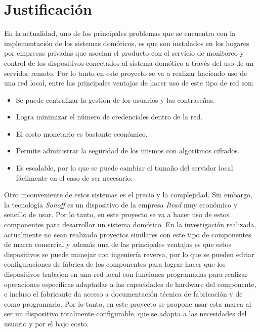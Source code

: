 \section{Justificación}

En la actualidad, uno de los principales problemas que se encuentra con la implementación de los sistemas domóticos, es que son instalados en los hogares por empresas privadas que asocian el producto con el servicio de monitoreo y control de los dispositivos conectados al sistema domótico a través del uso de un servidor remoto. Por lo tanto en este proyecto se va a realizar haciendo uso de una red local, entre las principales ventajas de hacer uso de este tipo de red son:

\begin{itemize}
\item Se puede centralizar la gestión de los usuarios y las contraseñas.
\item Logra minimizar el número de credenciales dentro de la red.
\item El costo monetario es bastante económico.
\item Permite administrar la seguridad de los mismos con algoritmos cifrados.
\item Es escalable, por lo que se puede cambiar el tamaño del servidor local fácilmente en el caso de ser necesario.
\end{itemize}

Otro inconveniente de estos sistemas es el precio y la complejidad. Sin embargo, la tecnología \textit{Sonoff} es un dispositivo de la empresa \textit{Itead} muy económico y sencillo de usar. Por lo tanto, en este proyecto se va a hacer uso de  estos componentes para desarrollar un sistema domótico. En la investigación realizada, actualmente no sean realizado proyectos similares con este tipo de componentes de marca comercial y además una de las principales ventajas es que estos dispositivos se puede manejar con ingeniería reversa, por lo que se pueden editar configuraciones de fábrica de los componentes para lograr hacer que los dispositivos trabajen en una red local con funciones programadas para realizar operaciones específicas adaptadas a las capacidades de hardware del componente, e incluso el fabricante da acceso a documentación técnica de fabricación y de como programarlo. Por lo tanto, en este proyecto se propone usar esta marca al ser un dispositivo totalmente configurable, que se adapta a las necesidades del usuario y por el bajo costo. 

